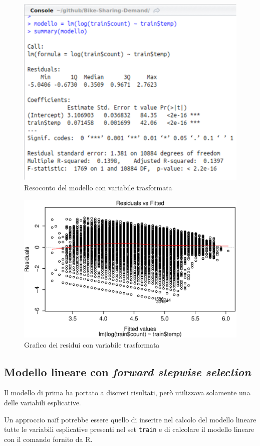 \begin{figure}
  \centering
  \includegraphics[width=.7\columnwidth]{images/simpl-lm-summary.eps}
  \caption{Resoconto del modello con variabile trasformata}
  \label{fig:simpl-lm-log-summary}
\end{figure}

\begin{figure}
  \centering
  \includegraphics[width=.7\columnwidth]{images/simple-lm-log-residuals.eps}
  \caption{Grafico dei residui con variabile trasformata}
  \label{fig:simpl-lm-log-residuals}
\end{figure}


\subsection{Modello lineare con \emph{forward stepwise selection}}\label{sec:mod-lin-fwd-sw}
Il modello di prima ha portato a discreti risultati, però utilizzava solamente
una delle variabili esplicative.

Un approccio naïf potrebbe essere quello di inserire nel calcolo del modello
lineare tutte le variabili esplicative presenti nel set \texttt{train} e di
calcolare il modello lineare con il comando fornito da R.

